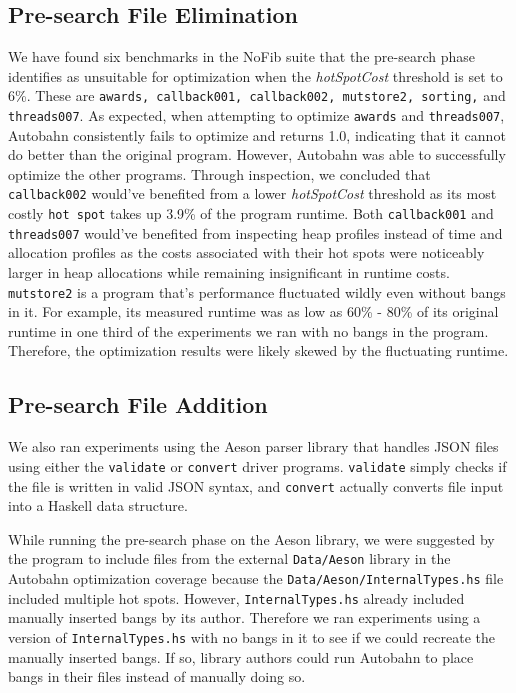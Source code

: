 \documentclass[format=sigplan, review=true]{acmart}
\newcommand{\hotspots}[0]{hot spots}
\newcommand{\hotspotcost}[0]{\textit{hotSpotCost}}
\newcommand{\preopt}[0]{pre-search}
\newcommand{\Preopt}[0]{Pre-search}
\begin{document}
\subsection{\Preopt{} File Elimination}

We have found six benchmarks in the NoFib suite that the \preopt{} phase identifies as unsuitable for optimization when the \hotspotcost{} threshold is set to 6\%. These are \texttt{awards, callback001, callback002, mutstore2, sorting,} and \texttt{threads007}. As expected, when attempting to optimize \texttt{awards} and \texttt{threads007}, Autobahn consistently fails to optimize and returns 1.0, indicating that it cannot do better than the original program. However, Autobahn was able to successfully optimize the other programs. Through inspection, we concluded that \texttt{callback002} would've benefited from a lower \hotspotcost{} threshold as its most costly \texttt{hot spot} takes up 3.9\% of the program runtime. Both \texttt{callback001} and \texttt{threads007} would've benefited from inspecting heap profiles instead of time and allocation profiles as the costs associated with their hot spots were noticeably larger in heap allocations while remaining insignificant in runtime costs. \texttt{mutstore2} is a program that's performance fluctuated wildly even without bangs in it. For example, its measured runtime was as low as 60\% - 80\% of its original runtime in one third of the experiments we ran with no bangs in the program. Therefore, the optimization results were likely skewed by the fluctuating runtime.

\subsection{\Preopt{} File Addition}

We also ran experiments using the Aeson parser library that handles JSON files using either the \texttt{validate} or \texttt{convert} driver programs. \texttt{validate} simply checks if the file is written in valid JSON syntax, and \texttt{convert} actually converts file input into a Haskell data structure. 

While running the \preopt{} phase on the Aeson library, we were suggested by the program to include files from the external \texttt{Data/Aeson} library in the Autobahn optimization coverage because the \texttt{Data/Aeson/InternalTypes.hs} file included multiple \hotspots{}. However, \texttt{InternalTypes.hs} already included manually inserted bangs by its author. Therefore we ran experiments using a version of \texttt{InternalTypes.hs} with no bangs in it to see if we could recreate the manually inserted bangs. If so, library authors could run Autobahn to place bangs in their files instead of manually doing so. 
\end{document}
